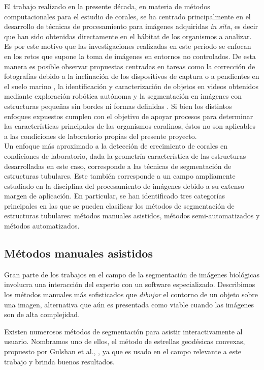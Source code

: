 \documentclass[journal]{IEEEtran}
\begin{document}
El trabajo realizado en la presente década, en materia de métodos computacionales para el
estudio de corales, se ha centrado principalmente en el desarrollo de técnicas de
procesamiento para imágenes adquiridas \textit{in situ}, es decir que han sido obtenidas
directamente en el hábitat de los organismos a analizar. Es por este motivo que las
investigaciones realizadas en este período se enfocan en los retos que supone la toma de
imágenes en entornos no controlados. De esta manera es posible observar propuestas
centradas en tareas como la corrección de fotografías debido a la inclinación de los
dispositivos de captura o a pendientes en el suelo marino \cite{slope}, la identificación
y caracterización de objetos en videos obtenidos mediante exploración robótica autónoma
\cite{exprobots} y la segmentación en imágenes con estructuras pequeñas sin bordes ni
formas definidas \cite{pequenosinforma}. Si bien los distintos enfoques expuestos cumplen
con el objetivo de apoyar procesos para determinar las características principales de las
organismos coralinos, éstos no son aplicables a las condiciones de laboratorio propias
del presente proyecto. \\

Un enfoque más aproximado a la detección de crecimiento de corales en condiciones de
laboratorio, dada la geometría característica de las estructuras desarrolladas en este
caso, corresponde a las técnicas de segmentación de estructuras tubulares. Este también
corresponde a un campo ampliamente estudiado en la disciplina del procesamiento de
imágenes debido a su extenso margen de aplicación. En particular, se han identificado
tres categorías principales en las que se pueden clasificar los métodos de segmentación
de estructuras tubulares: métodos manuales asistidos, métodos semi-automatizados y
métodos automatizados.


\subsection{Métodos manuales asistidos}

Gran parte de los trabajos en el campo de la segmentación de imágenes biológicas
involucra una interacción del experto con un software especializado. Describimos los
métodos manuales más sofisticados que \textit{dibujar} el contorno de un objeto sobre una
imagen, alternativa que aún es presentada como viable \cite{neal_methods_2015} cuando las imágenes son de alta complejidad.

Existen numerosos métodos de segmentación para asistir interactivamente al usuario.
Nombramos uno de ellos, el método de estrellas geodésicas convexas, propuesto por Gulshan
et al., \cite{gulshan_geodesic_2010}, ya que es usado en el campo relevante a este
trabajo \cite{treibitz_wide_2015} y brinda buenos resultados.
\end{document}

